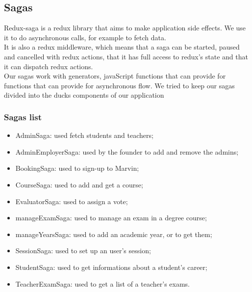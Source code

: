 \documentclass[../redux]{subfiles}
\begin{document}
	\subsection{Sagas}
	Redux-saga is a redux library that aims to make application side effects. We use it to do asynchronous calls, for example to fetch data.\\
	It is also a redux middleware, which means that a saga can be started, paused and cancelled with redux actions, that it has full access to redux's state and that it can dispatch redux actions.\\
	Our sagas work with generators, javaScript functions that can provide for functions that can provide for asynchronous flow. We tried to keep our sagas divided into the ducks components of our application
	
	\subsubsection{Sagas list}
	\begin{itemize}
		\item AdminSaga: used fetch students and teachers;
		\item AdminEmployerSaga: used by the founder to add and remove the admins;
		\item BookingSaga: used to sign-up to Marvin;
		\item CourseSaga: used to add and get a course;
		\item EvaluatorSaga: used to assign a vote;
		\item manageExamSaga: used to manage an exam in a degree course;
		\item manageYearsSaga: used to add an academic year, or to get them;
		\item SessionSaga: used to set up an user's session;
		\item StudentSaga: used to get informations about a student's career;
		\item TeacherExamSaga: used to get a list of a teacher's exams.
	\end{itemize}
\end{document}
